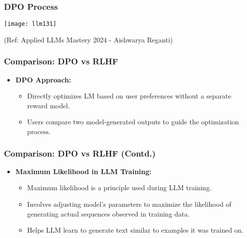 \begin{frame}[fragile]\frametitle{DPO Process}

\begin{center}
\texttt{[image: llm131]}
\end{center}				

{\tiny (Ref: Applied LLMs Mastery 2024 - Aishwarya Reganti)}

\end{frame}


\begin{frame}[fragile]\frametitle{Comparison: DPO vs RLHF}
  \begin{itemize}
    \item \textbf{DPO Approach:}
      \begin{itemize}
        \item Directly optimizes LM based on user preferences without a separate reward model.
        \item Users compare two model-generated outputs to guide the optimization process.
      \end{itemize}
  \end{itemize}
\end{frame}

\begin{frame}[fragile]\frametitle{Comparison: DPO vs RLHF (Contd.)}
  \begin{itemize}
    \item \textbf{Maximum Likelihood in LLM Training:}
      \begin{itemize}
        \item Maximum likelihood is a principle used during LLM training.
        \item Involves adjusting model's parameters to maximize the likelihood of generating actual sequences observed in training data.
        \item Helps LLM learn to generate text similar to examples it was trained on.
      \end{itemize}
  \end{itemize}
\end{frame}


